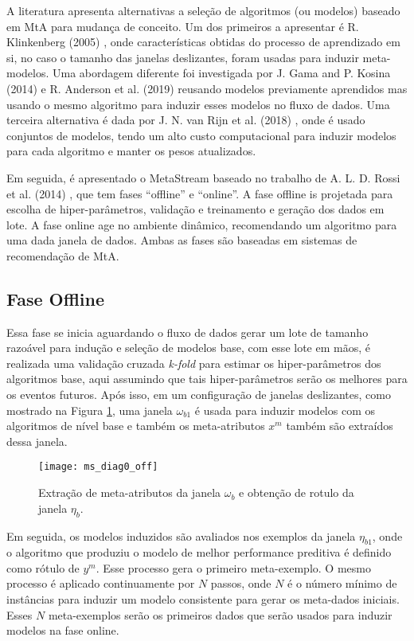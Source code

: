 A literatura apresenta alternativas a seleção de algoritmos (ou modelos) baseado em MtA para mudança de conceito. Um dos primeiros a apresentar é R. Klinkenberg (2005) \cite{klinkenberg2005}, onde características obtidas do processo de aprendizado em si, no caso o tamanho das janelas deslizantes, foram usadas para induzir meta-modelos.
Uma abordagem diferente foi investigada por J. Gama and P. Kosina (2014) \cite{gama2014} e R. Anderson et al. (2019) \cite{Anderson2019}
reusando modelos previamente aprendidos mas usando o mesmo algoritmo para induzir esses modelos no fluxo de dados. Uma terceira alternativa é dada por J. N. van Rijn et al. (2018) \cite{VanRijn2018}, onde é usado conjuntos de modelos, tendo um alto custo computacional para induzir modelos para cada algoritmo e manter os pesos atualizados.

Em seguida, é apresentado o MetaStream baseado no trabalho de A. L. D. Rossi et al. (2014) \cite{rossi2014metastream}, que tem fases ``offline'' e ``online''.
A fase offline is projetada para escolha de hiper-parâmetros, validação e treinamento e geração dos dados em lote.
A fase online age no ambiente dinâmico, recomendando um algoritmo para uma dada janela de dados. Ambas as fases são baseadas em sistemas de recomendação de MtA.


\subsection{Fase Offline}
\label{subsubsec:offline}
Essa fase se inicia aguardando o fluxo de dados gerar um lote de tamanho razoável para indução e seleção de modelos base, com esse lote em mãos, é realizada uma validação cruzada \textit{k-fold} para estimar os hiper-parâmetros dos algoritmos base, aqui assumindo que tais hiper-parâmetros serão os melhores para os eventos futuros.
Após isso, em um configuração de janelas deslizantes, como mostrado na Figura \ref{fig:ms_diag0_off}, uma janela $\omega_{b1}$ é usada para induzir modelos com os algoritmos de nível base e também os meta-atributos $x^m$ também são extraídos dessa janela.

\begin{figure}[ht]
    \centering
    \texttt{[image: ms\_diag0\_off]}
    \caption{Extração de meta-atributos da janela $\omega_b$ e obtenção de rotulo da janela $\eta_b$.}
    \label{fig:ms_diag0_off}
\end{figure}

Em seguida, os modelos induzidos são avaliados nos exemplos da janela $\eta_{b1}$, onde o algoritmo que produziu o modelo de melhor performance preditiva é definido como rótulo de $y^m$. Esse processo gera o primeiro meta-exemplo. O mesmo processo é aplicado continuamente por $N$ passos, onde $N$ é o número mínimo de instâncias para induzir um modelo consistente para gerar os meta-dados iniciais. Esses $N$ meta-exemplos serão os primeiros dados que serão usados para induzir modelos na fase online.

